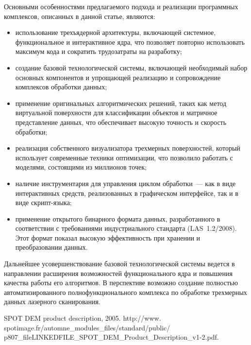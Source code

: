 \begin{multicols}{2}
   
   Основными особенностями предлагаемого подхода и реализации 
программных комплексов, описанных в данной статье, являются:
   \begin{itemize}
\item использование трехъядерной архитектуры, включающей системное, 
функциональное и интерактивное ядра, что позволяет повторно использовать 
максимум кода и сократить трудозатраты на разработку;
\item создание базовой технологической системы, включающей необходимый 
набор основных компонентов и упрощающей реализацию и сопровождение 
комплексов обработки данных;
\item применение оригинальных алгоритмических решений, таких как метод 
виртуальной поверхности для классификации объектов и матричное 
представление данных, что обеспечивает высокую точность и скорость 
обработки;
\item реализация собственного визуализатора трехмерных поверхностей, 
который использует современные техники оптимизации, что позволило 
работать с моделями, состоящими из\linebreak
миллионов точек;
\item наличие инструментария для управления цик\-лом обработки~--- как в виде 
интерактивных средств, реализованных в графическом интерфейсе, так и в виде 
скрипт-языка;
\item применение открытого бинарного формата данных, разработанного в 
соответствии с требованиями индустриального стандарта (LAS~1.2/2008). Этот 
формат показал высокую эффективность при хранении и преобразовании 
данных.
\end{itemize}

   Дальнейшее усовершенствование базовой технологической системы ведется 
в направлении расширения возможностей функционального ядра и повышения 
качества работы его алгоритмов. В перспективе возможно создание полностью 
автоматизированного полнофункционального комплекса по обработке 
трехмерных данных лазерного сканирования.
      
{\small\frenchspacing
{%
\begin{thebibliography}{99}    
SPOT DEM product description, 2005. 
{\sf http://www. spotimage.fr/automne\_modules\_files/standard/public/\linebreak 
p807\_fileLINKEDFILE\_SPOT\_DEM\_Product\_Descrip\linebreak tion\_v1-2.pdf}.


\end{thebibliography}}}
\end{multicols}
